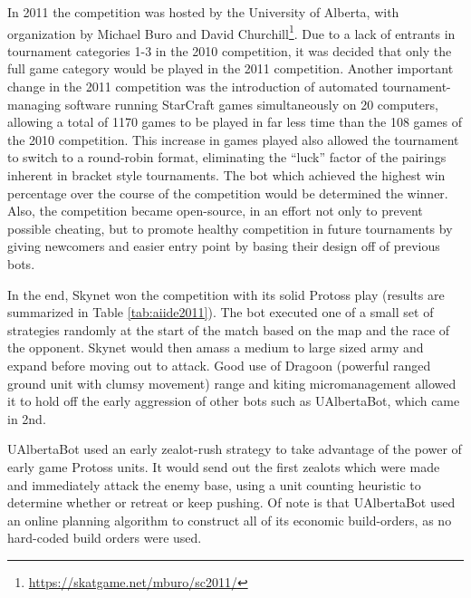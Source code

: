 \documentclass[journal]{IEEEtran}
\begin{document}
In 2011 the competition was hosted by the University of Alberta, with organization by Michael Buro and
David Churchill\footnote{\url{https://skatgame.net/mburo/sc2011/}}. Due to a lack of entrants in tournament categories 1-3 in the 2010 competition, it was
decided that only the full game category would be played in the 2011 competition. Another important
change in the 2011 competition was the introduction of automated tournament-managing software running
StarCraft games simultaneously on 20 computers, allowing a total of 1170 games to be played in far less
time than the 108 games of the 2010 competition. This increase in games played also allowed the tournament
to switch to a round-robin format, eliminating the ``luck'' factor of the pairings inherent in bracket
style tournaments. The bot which achieved the highest win percentage over the course of the competition would
be determined the winner. Also, the competition became open-source, in an effort not
only to prevent possible cheating, but to promote healthy competition in future tournaments by giving
newcomers and easier entry point by basing their design off of previous bots.

In the  end, Skynet  won the competition  with its solid  Protoss play
(results  are  summarized   in  Table  \ref{tab:aiide2011}).  The  bot
executed one of a small set of strategies randomly at the start of the
match based on the map and the race of the opponent. Skynet would then
amass a  medium to large  sized army and  expand before moving  out to
attack. Good  use of Dragoon (powerful ranged ground unit with clumsy movement) range and  kiting micromanagement allowed
it to hold off the early aggression of other bots such as UAlbertaBot,
which came in 2nd.

UAlbertaBot used an early zealot-rush strategy to take advantage of the power of early game Protoss units. 
It would send out the first zealots which were made and immediately attack the enemy base, using a unit
counting heuristic to determine whether or retreat or keep pushing. Of note is that UAlbertaBot used an
online planning algorithm to construct all of its economic build-orders\cite{churchill2011build}, as no hard-coded build orders
were used. 
\end{document}
